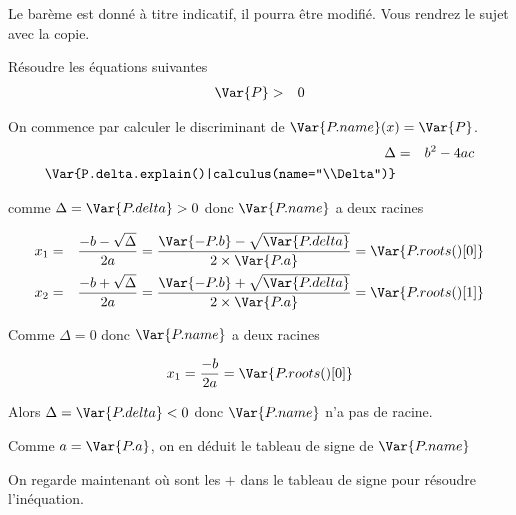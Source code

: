 \documentclass[a4paper,10pt, table]{/media/documents/Cours/Prof/Enseignements/tools/style/classDS}
\date{02 mars 2015}
\begin{document}
\maketitle

Le barème est donné à titre indicatif, il pourra être modifié. Vous rendrez le sujet avec la copie.

\begin{questions}

    \question
    Résoudre les équations suivantes
    \begin{eqnarray*}
        \Var{P} & > &0 \\
    \end{eqnarray*}

    \begin{solution}
        On commence par calculer le discriminant de $\Var{P.name}(x) = \Var{P}$.
        \begin{eqnarray*}
            \Delta & = & b^2-4ac \\
            \Var{P.delta.explain()|calculus(name="\\Delta")}
        \end{eqnarray*}

        comme $\Delta = \Var{P.delta} > 0$ donc $\Var{P.name}$ a deux racines

            \begin{eqnarray*}
                x_1 & = & \frac{-b - \sqrt{\Delta}}{2a} =  \frac{\Var{-P.b} - \sqrt{\Var{P.delta}}}{2 \times \Var{P.a}} = \Var{P.roots()[0] } \\
                x_2 & = & \frac{-b + \sqrt{\Delta}}{2a} =  \frac{\Var{-P.b} + \sqrt{\Var{P.delta}}}{2 \times \Var{P.a}} = \Var{P.roots()[1] }
            \end{eqnarray*}


        Comme $\Delta = 0$ donc $\Var{P.name}$ a deux racines

            \begin{eqnarray*}
                x_1 = \frac{-b}{2a} = \Var{P.roots()[0]} \\
            \end{eqnarray*}


        Alors $\Delta = \Var{P.delta} < 0$ donc $\Var{P.name}$ n'a pas de racine.

        Comme $a = \Var{P.a}$, on en déduit le tableau de signe de $\Var{P.name}$
            \begin{center}
            \end{center}
        On regarde maintenant où sont les $+$ dans le tableau de signe pour résoudre l'inéquation.
        \end{solution}


\end{questions}
\end{document}

